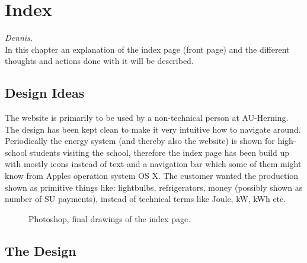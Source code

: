 \newpage
\chapter{Index}\textit{Dennis.}\\
In this chapter an explanation of the index page (front page)  and the different thoughts and actions done with it will be described.  
\section{Design Ideas}
The website is primarily to be used by a non-technical person at AU-Herning. The design has been kept clean to make it very intuitive how to navigate around. Periodically the energy system (and thereby also the website) is shown for high-school students visiting the school, therefore the index page has been build up with mostly icons instead of text and a navigation bar which some of them might know from Apples operation system OS X. The customer wanted the production shown as primitive things like: lightbulbs, refrigerators, money (possibly shown as number of SU payments), instead of technical terms like Joule, kW, kWh etc.
\begin{figure}[h!]
	\center
		\setlength\fboxsep{0pt}
		\setlength\fboxrule{1pt}
   	\caption{Photoshop, final drawings of the index page.}
   	\label{fig:index_page_design}
\end{figure}
\section{The Design}

